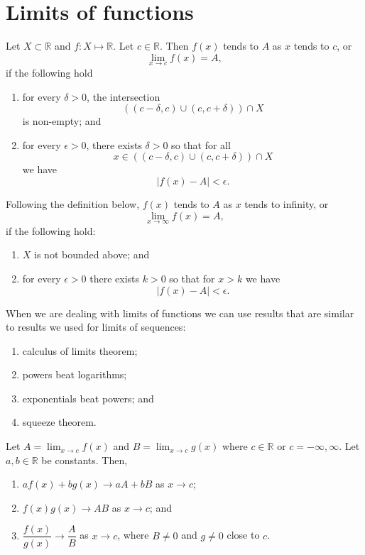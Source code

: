 \section{Limits of functions}
 
\begin{definition}
    Let $X\subset\mathbb R$ and $f:X\mapsto\mathbb R$. Let $c\in\mathbb R$. Then $f(x)$ tends to $A$ as $x$ tends to $c$, or \[\lim_{x\to c}f(x)=A,\] if the following hold
    \begin{enumerate}
        \item for every $\delta>0$, the intersection \[((c-\delta,c)\cup(c,c+\delta))\cap X\] is non-empty; and
        
        \item for every $\epsilon>0$, there exists $\delta>0$ so that for all \[x\in((c-\delta,c)\cup(c,c+\delta))\cap X\] we have \[|f(x)-A|<\epsilon.\]
    \end{enumerate}
\end{definition}

\begin{definition}
    Following the definition below, $f(x)$ tends to $A$ as $x$ tends to infinity, or \[\lim_{x\to\infty}f(x)=A,\] if the following hold:
    \begin{enumerate}
        \item $X$ is not bounded above; and
        \item for every $\epsilon>0$ there exists $k>0$ so that for $x>k$ we have \[|f(x)-A|<\epsilon.\]
    \end{enumerate}
\end{definition}

When we are dealing with limits of functions we can use results that are similar to results we used for limits of sequences:
\begin{enumerate}
    \item calculus of limits theorem;
    \item powers beat logarithms;
    \item exponentials beat powers; and
    \item squeeze theorem.
\end{enumerate}

\begin{theorem}
    Let $A=\lim_{x\to c}f(x)$ and $B=\lim_{x\to c}g(x)$ where $c\in\mathbb R$ or $c=-\infty,\infty$. Let $a,b\in\mathbb R$ be constants. Then,
    \begin{enumerate}
        \item $af(x)+bg(x)\to aA+bB$ as $x\to c$;
        \item $f(x)g(x)\to AB$ as $x\to c$; and
        \item $\dfrac{f(x)}{g(x)}\to\dfrac AB$ as $x\to c$, where $B\neq 0$ and $g\neq 0$ close to $c$.
    \end{enumerate}
\end{theorem}

